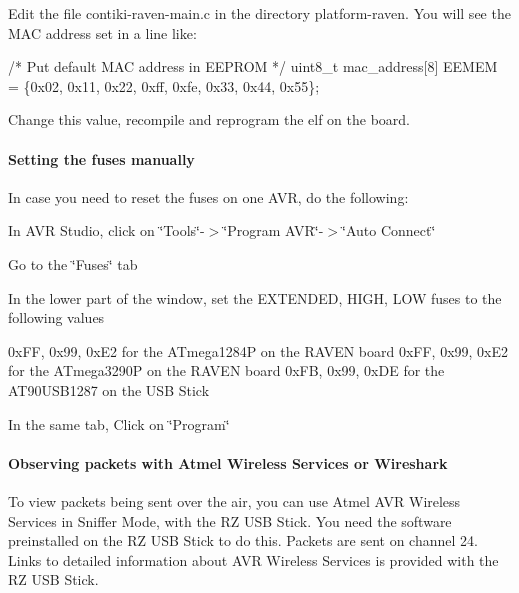 \begin{DoxyItemize}
\item Edit the file contiki-\/raven-\/main.\+c in the directory platform-\/raven. You will see the M\+AC address set in a line like\+:\end{DoxyItemize}

\begin{DoxyCode}
\textcolor{comment}{/* Put default MAC address in EEPROM */}
uint8\_t mac\_address[8] EEMEM = \{0x02, 0x11, 0x22, 0xff, 0xfe, 0x33, 0x44, 0x55\};
\end{DoxyCode}


\begin{DoxyItemize}
\item Change this value, recompile and reprogram the elf on the board.\end{DoxyItemize}
\hypertarget{a00072_advanced_fuses}{}\paragraph{Setting the fuses manually}\label{a00072_advanced_fuses}
In case you need to reset the fuses on one A\+VR, do the following\+: \begin{DoxyItemize}
\item In A\+VR Studio, click on \char`\"{}\+Tools\char`\"{}-\/$>$\char`\"{}\+Program A\+V\+R\char`\"{}-\/$>$\char`\"{}\+Auto Connect\char`\"{} \item Go to the \char`\"{}\+Fuses\char`\"{} tab \item In the lower part of the window, set the E\+X\+T\+E\+N\+D\+ED, H\+I\+GH, L\+OW fuses to the following values \begin{DoxyVerb}0xFF, 0x99, 0xE2 for the ATmega1284P on the RAVEN board
0xFF, 0x99, 0xE2 for the ATmega3290P on the RAVEN board
0xFB, 0x99, 0xDE for the AT90USB1287 on the USB Stick
\end{DoxyVerb}
 \item In the same tab, Click on \char`\"{}\+Program\char`\"{} \end{DoxyItemize}
\hypertarget{a00072_advanced_capture}{}\paragraph{Observing packets with Atmel Wireless Services or Wireshark}\label{a00072_advanced_capture}
To view packets being sent over the air, you can use Atmel A\+VR Wireless Services in Sniffer Mode, with the RZ U\+SB Stick. You need the software preinstalled on the RZ U\+SB Stick to do this. Packets are sent on channel 24. Links to detailed information about A\+VR Wireless Services is provided with the RZ U\+SB Stick.

